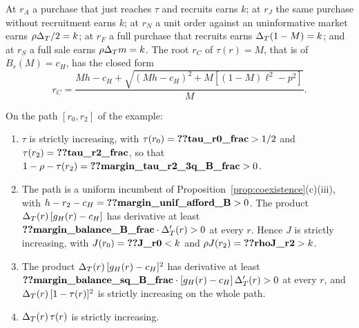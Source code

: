 At \(r_A\) a purchase that just reaches \(\tau\) and recruits earns \(k\); at \(r_J\) the same purchase without
recruitment earns \(k\); at \(r_N\) a unit order against an uninformative market earns \(\rho\Delta_T/2=k\); at \(r_F\) a full purchase
that recruits earns \(\Delta_T(1-M)=k\); and at \(r_S\) a full sale earns \(\rho\Delta_T m=k\). The root \(r_C\) of \(\tau(r)=M\),
that is of \(B_r(M)=c_H\), has the closed form
\[
r_C=\frac{Mh-c_H+\sqrt{(Mh-c_H)^2+M[(1-M)\ell^2-p^2]}}{M}.
\]

\begin{lemma}\label{lem:a4-path}
On the path \([r_0,r_2]\) of the example:
\begin{enumerate}[label=(\alph*),leftmargin=2em]
\item \(\tau\) is strictly increasing, with \(\tau(r_0)=\reg{tau_r0_frac}>1/2\) and \(\tau(r_2)=\reg{tau_r2_frac}\), so
that \(1-\rho-\tau(r_2)=\reg{margin_tau_r2_3q_B_frac}>0\).
\item The path is a uniform incumbent of Proposition~\ref{prop:coexistence}(c)(iii), with
\(h-r_2-c_H=\reg{margin_unif_afford_B}>0\). The product \(\Delta_T(r)\,[g_H(r)-c_H]\) has derivative at least
\(\reg{margin_balance_B_frac}\cdot\DT'(r)>0\) at every \(r\). Hence \(J\) is strictly increasing, with
\(J(r_0)=\reg{J_r0}<k\) and \(\rho J(r_2)=\reg{rhoJ_r2}>k\).
\item The product \(\Delta_T(r)\,[g_H(r)-c_H]^2\) has derivative at least
\(\reg{margin_balance_sq_B_frac}\cdot[g_H(r)-c_H]\,\DT'(r)>0\) at every \(r\), and \(\Delta_T(r)\,[1-\tau(r)]^2\) is strictly
increasing on the whole path.
\item \(\Delta_T(r)\,\tau(r)\) is strictly increasing.
\end{enumerate}
\end{lemma}


